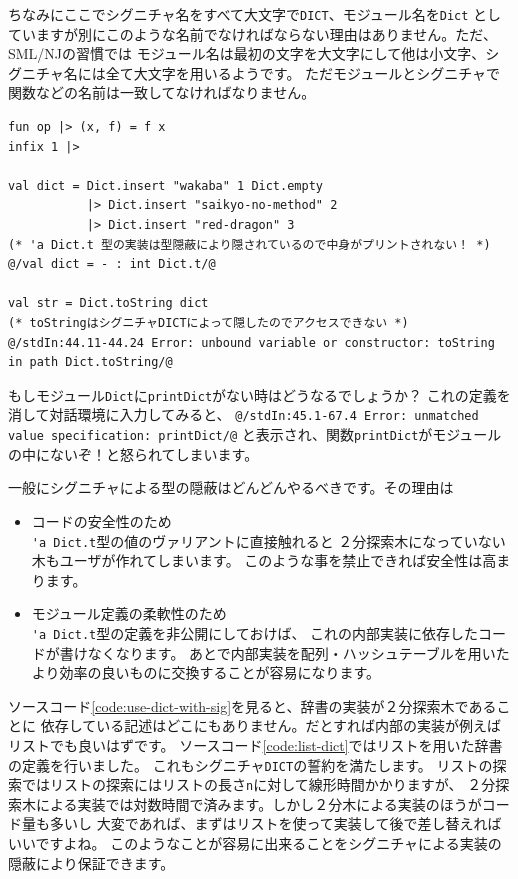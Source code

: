 \documentclass[11pt,a4paper]{article}
\begin{document}
ちなみにここでシグニチャ名をすべて大文字で\lstinline{DICT}、モジュール名を\lstinline{Dict}
としていますが別にこのような名前でなければならない理由はありません。ただ、SML/NJの習慣では
モジュール名は最初の文字を大文字にして他は小文字、シグニチャ名には全て大文字を用いるようです。
ただモジュールとシグニチャで関数などの名前は一致してなければなりません。

\begin{lstlisting}[caption=\lstinline{Dict}を使おう,label=code:use-dict-with-sig]
fun op |> (x, f) = f x
infix 1 |>

val dict = Dict.insert "wakaba" 1 Dict.empty
           |> Dict.insert "saikyo-no-method" 2
           |> Dict.insert "red-dragon" 3
(* 'a Dict.t 型の実装は型隠蔽により隠されているので中身がプリントされない！ *)
@/val dict = - : int Dict.t/@

val str = Dict.toString dict
(* toStringはシグニチャDICTによって隠したのでアクセスできない *)
@/stdIn:44.11-44.24 Error: unbound variable or constructor: toString in path Dict.toString/@
\end{lstlisting}

もしモジュール\lstinline{Dict}に\lstinline{printDict}がない時はどうなるでしょうか？
これの定義を消して対話環境に入力してみると、
\lstinline{@/stdIn:45.1-67.4 Error: unmatched value specification: printDict/@}
と表示され、関数\lstinline{printDict}がモジュールの中にないぞ！と怒られてしまいます。

一般にシグニチャによる型の隠蔽はどんどんやるべきです。その理由は
\begin{itemize}
\item コードの安全性のため\\
  \lstinline{'a Dict.t}型の値のヴァリアントに直接触れると
  ２分探索木になっていない木もユーザが作れてしまいます。
  このような事を禁止できれば安全性は高まります。
\item モジュール定義の柔軟性のため\\
  \lstinline{'a Dict.t}型の定義を非公開にしておけば、
これの内部実装に依存したコードが書けなくなります。
あとで内部実装を配列・ハッシュテーブルを用いたより効率の良いものに交換することが容易になります。
\end{itemize}

ソースコード\ref{code:use-dict-with-sig}を見ると、辞書の実装が２分探索木であることに
依存している記述はどこにもありません。だとすれば内部の実装が例えばリストでも良いはずです。
ソースコード\ref{code:list-dict}ではリストを用いた辞書の定義を行いました。
これもシグニチャ\lstinline{DICT}の誓約を満たします。
リストの探索ではリストの探索にはリストの長さ\lstinline{n}に対して線形時間かかりますが、
２分探索木による実装では対数時間で済みます。しかし２分木による実装のほうがコード量も多いし
大変であれば、まずはリストを使って実装して後で差し替えればいいですよね。
このようなことが容易に出来ることをシグニチャによる実装の隠蔽により保証できます。
\end{document}
